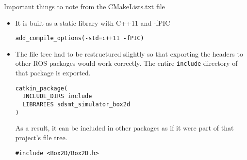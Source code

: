 Important things to note from the CMakeLists.txt file
\begin{itemize}
	\item It is built as a static library with C++11 and -fPIC
	\begin{lstlisting}
add_compile_options(-std=c++11 -fPIC)
	\end{lstlisting}
	\item The file tree had to be restructured slightly so that exporting the headers to other ROS packages would work correctly. The entire \lstinline|include| directory of that package is exported.

	\begin{lstlisting}
catkin_package(
  INCLUDE_DIRS include
  LIBRARIES sdsmt_simulator_box2d
)
	\end{lstlisting}
	As a result, it can be included in other packages as if it were part of that project's file tree.
	\begin{lstlisting}
#include <Box2D/Box2D.h>
	\end{lstlisting}
\end{itemize}
